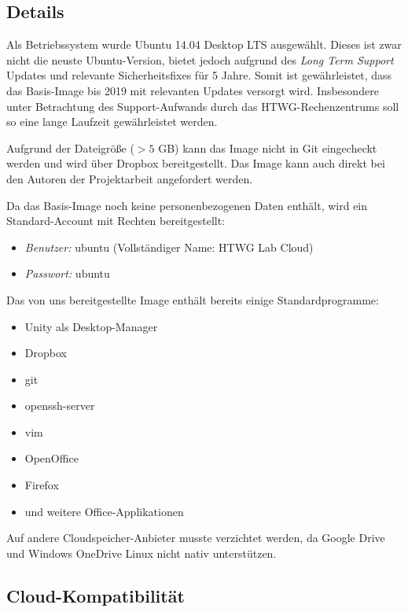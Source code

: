 \subsection{Details}

Als Betriebssystem wurde Ubuntu 14.04 Desktop LTS ausgewählt. 
Dieses ist zwar nicht die neuste Ubuntu-Version, bietet jedoch aufgrund des \emph{Long Term Support} Updates und relevante Sicherheitsfixes für 5 Jahre. 
Somit ist gewährleistet, dass das Basis-Image bis 2019 mit relevanten Updates versorgt wird. 
Insbesondere unter Betrachtung des Support-Aufwands durch das HTWG-Rechenzentrums soll so eine lange Laufzeit gewährleistet werden.

Aufgrund der Dateigröße ($> 5$ GB) kann das Image nicht in Git eingecheckt werden und wird über Dropbox \cite{dropboxImage} bereitgestellt. Das Image kann auch direkt bei den Autoren der Projektarbeit angefordert werden.

Da das Basis-Image noch keine personenbezogenen Daten enthält, wird ein Standard-Account mit  Rechten bereitgestellt:

\begin{itemize}
\item \emph{Benutzer:} ubuntu (Vollständiger Name: HTWG Lab Cloud)
\item \emph{Passwort:} ubuntu
\end{itemize}

Das von uns bereitgestellte Image enthält bereits einige Standardprogramme:

\begin{itemize}
\item Unity als Desktop-Manager
\item Dropbox
\item git
\item openssh-server
\item vim
\item OpenOffice
\item Firefox
\item und weitere Office-Applikationen
\end{itemize}

Auf andere Cloudspeicher-Anbieter musste verzichtet werden, da Google Drive und Windows OneDrive Linux nicht nativ unterstützen.

\subsection{Cloud-Kompatibilität}

